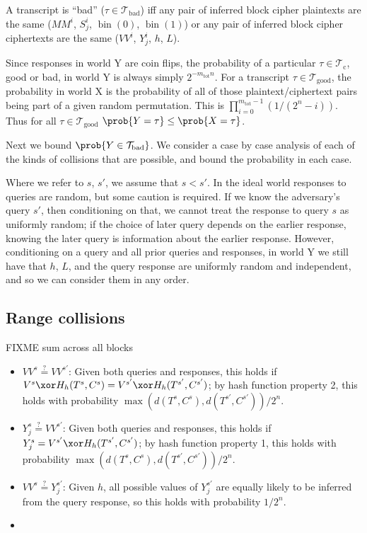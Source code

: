 \documentclass[letterpaper,11pt]{article}
\newcommand*{\MM}{\mathit{MM}}
\newcommand*{\mtot}{m_{\mathrm{tot}}}
\newcommand*{\qeq}{\stackrel{\text{?}}{=}}
\newcommand*{\Tb}{\mathcal{T}_\mathrm{bad}}
\newcommand*{\Tc}{\mathcal{T}_\mathrm{c}}
\newcommand*{\Tg}{\mathcal{T}_\mathrm{good}}
\newcommand*{\VV}{\mathit{VV}}
\DeclareMathOperator{\fromint}{bin}
\begin{document}
A transcript is ``bad'' (\(\tau \in \Tb\)) iff any pair of 
inferred block cipher plaintexts are the same
(\(\MM^i\), \(S_j^i\), \(\fromint(0)\), \(\fromint(1)\))
or any pair of inferred block cipher ciphertexts are the same
(\(\VV^i\), \(Y_j^i\), \(h\), \(L\)).

Since responses in world Y are coin flips,
the probability of a 
particular \(\tau \in \Tc\), good or bad,
in world Y is always simply \(2^{-\mtot n}\).
For a transcript \(\tau \in \Tg\),
the probability in world X
is the probability of all of those plaintext/ciphertext
pairs being part of a given random permutation.
This is 
\(\prod_{i=0}^{\mtot -1}(1/(2^n - i))\).
Thus for all \(\tau \in \Tg\)
\(\prob{Y = \tau} \leq \prob{X = \tau}\). 

Next we bound \(\prob{Y \in \Tb}\).
We consider a case by case analysis of
each of the kinds of collisions that are
possible, and bound the probability in each case.

Where we refer to \(s\), \(s'\), we assume that \(s < s'\).
In the ideal world responses to queries are random,
but some caution is required.
If we know the adversary's query \(s'\), then conditioning on that,
we cannot treat the response to query \(s\) as uniformly random;
if the choice of later query depends on the earlier response,
knowing the later query is information about the earlier response.
However, conditioning on a query and all prior queries and responses,
in world Y we still have that \(h\), \(L\), and the
query response are uniformly random and independent,
and so we can consider them in any order.

\subsection{Range collisions}

FIXME sum across all blocks

\begin{itemize}
    \item \(\VV^s \qeq \VV^{s'}\): Given both queries and responses,
    this holds if \(V^s \xor H_h(T^s, C^s) = V^{s'} \xor H_h(T^{s'}, C^{s'})\);
    by hash function property 2, this holds with probability
    \(\max(d(T^s, C^s), d(T^{s'}, C^{s'}))/2^n\).
    \item \(Y_j^s \qeq \VV^{s'}\): Given both queries and responses,
    this holds if \(Y_j^s = V^{s'} \xor H_h(T^{s'}, C^{s'})\);
    by hash function property 1, this holds with probability
    \(\max(d(T^s, C^s), d(T^{s'}, C^{s'}))/2^n\).
    \item \(VV^s \qeq Y_j^{s'}\): Given \(h\), all possible
    values of \(Y_j^{s'}\) are equally likely to be inferred
    from the query response, so this holds with probability
    \(1/2^n\).
    \item 


\end{itemize}
\end{document}
